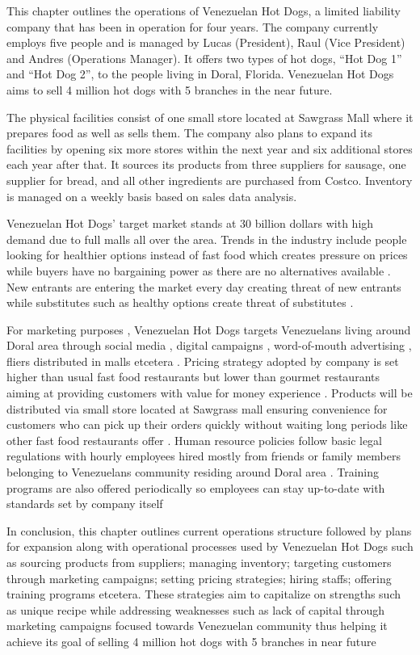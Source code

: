 

This chapter outlines the operations of Venezuelan Hot Dogs, a limited liability company that has been in operation for four years. The company currently employs five people and is managed by Lucas (President), Raul (Vice President) and Andres (Operations Manager). It offers two types of hot dogs, “Hot Dog 1” and “Hot Dog 2”, to the people living in Doral, Florida. Venezuelan Hot Dogs aims to sell 4 million hot dogs with 5 branches in the near future. 

The physical facilities consist of one small store located at Sawgrass Mall where it prepares food as well as sells them. The company also plans to expand its facilities by opening six more stores within the next year and six additional stores each year after that. It sources its products from three suppliers for sausage, one supplier for bread, and all other ingredients are purchased from Costco. Inventory is managed on a weekly basis based on sales data analysis. 

Venezuelan Hot Dogs' target market stands at 30 billion dollars with high demand due to full malls all over the area. Trends in the industry include people looking for healthier options instead of fast food which creates pressure on prices while buyers have no bargaining power as there are no alternatives available . New entrants are entering the market every day creating threat of new entrants while substitutes such as healthy options create threat of substitutes . 

For marketing purposes , Venezuelan Hot Dogs targets Venezuelans living around Doral area through social media , digital campaigns , word-of-mouth advertising , fliers distributed in malls etcetera . Pricing strategy adopted by company is set higher than usual fast food restaurants but lower than gourmet restaurants aiming at providing customers with value for money experience . Products will be distributed via small store located at Sawgrass mall ensuring convenience for customers who can pick up their orders quickly without waiting long periods like other fast food restaurants offer . Human resource policies follow basic legal regulations with hourly employees hired mostly from friends or family members belonging to Venezuelans community residing around Doral area . Training programs are also offered periodically so employees can stay up-to-date with standards set by company itself  

In conclusion, this chapter outlines current operations structure followed by plans for expansion along with operational processes used by Venezuelan Hot Dogs such as sourcing products from suppliers; managing inventory; targeting customers through marketing campaigns; setting pricing strategies; hiring staffs; offering training programs etcetera. These strategies aim to capitalize on strengths such as unique recipe while addressing weaknesses such as lack of capital through marketing campaigns focused towards Venezuelan community thus helping it achieve its goal of selling 4 million hot dogs with 5 branches in near future